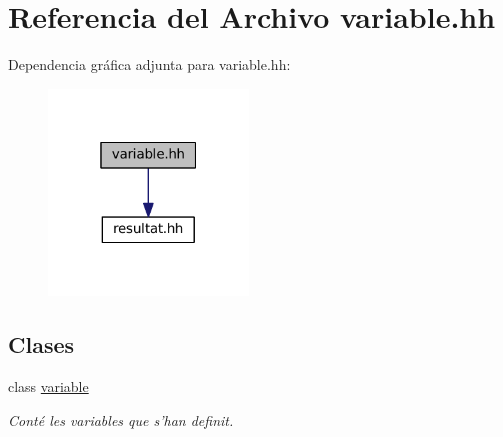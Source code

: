\hypertarget{variable_8hh}{}\section{Referencia del Archivo variable.\+hh}
\label{variable_8hh}
Dependencia gráfica adjunta para variable.\+hh\+:\nopagebreak
\begin{figure}[H]
\begin{center}
\leavevmode
\includegraphics[width=151pt]{variable_8hh__incl}
\end{center}
\end{figure}
\subsection*{Clases}
\begin{DoxyCompactItemize}
\item 
class \hyperlink{classvariable}{variable}
\begin{DoxyCompactList}\small\item\em Conté les variables que s’han definit. \end{DoxyCompactList}\end{DoxyCompactItemize}
